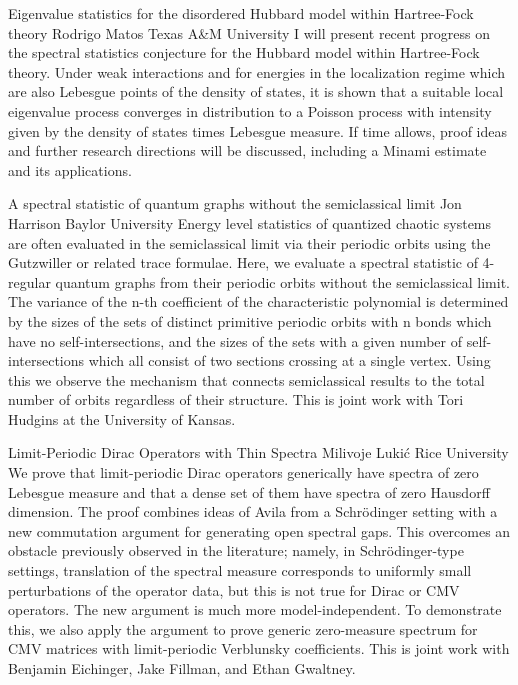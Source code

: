 \begin{addmargin}[2em]{0em}
\vspace{2ex}
\abs
{Eigenvalue statistics for the disordered Hubbard model within Hartree-Fock theory}
{Rodrigo Matos}
{Texas A\&M University}
{I will present recent progress on the spectral statistics conjecture for the Hubbard model within Hartree-Fock theory. Under weak interactions and for energies in the localization regime which are also Lebesgue points of the density of states, it is shown that a suitable local eigenvalue process converges in distribution to a Poisson process with intensity given by the density of states times Lebesgue measure. If time allows, proof ideas and further research directions will be discussed, including a Minami estimate and its applications.}


\vspace{1.5ex}
\abs
{A spectral statistic of quantum graphs without the semiclassical limit}
{Jon Harrison}
{Baylor University}
{Energy level statistics of quantized chaotic systems are often evaluated in the semiclassical limit via their periodic orbits using the Gutzwiller or related trace formulae. Here, we evaluate a spectral statistic of 4-regular quantum graphs from their periodic orbits without the semiclassical limit. The variance of the n-th coefficient of the characteristic polynomial is determined by the sizes of the sets of distinct primitive periodic orbits with n bonds which have no self-intersections, and the sizes of the sets with a given number of self-intersections which all consist of two sections crossing at a single vertex. Using this we observe the mechanism that connects semiclassical results to the total number of orbits regardless of their structure.  This is joint work with Tori Hudgins at the University of Kansas.}


\vspace{1.5ex}
\abs
{Limit-Periodic Dirac Operators with Thin Spectra}
{Milivoje Lukić}
{Rice University}
{We prove that limit-periodic Dirac operators generically have spectra
of zero Lebesgue measure and that a dense set of them have spectra of
zero Hausdorff dimension. The proof combines ideas of Avila from a
Schr\"odinger setting with a new commutation argument for generating
open spectral gaps. This overcomes an obstacle previously observed in
the literature; namely, in Schr\"odinger-type settings, translation of
the spectral measure corresponds to uniformly small perturbations of
the operator data, but this is not true for Dirac or CMV operators.
The new argument is much more model-independent. To demonstrate this,
we also apply the argument to prove generic zero-measure spectrum for
CMV matrices with limit-periodic Verblunsky coefficients. This is
joint work with Benjamin Eichinger, Jake Fillman, and Ethan Gwaltney.}



\end{addmargin}
